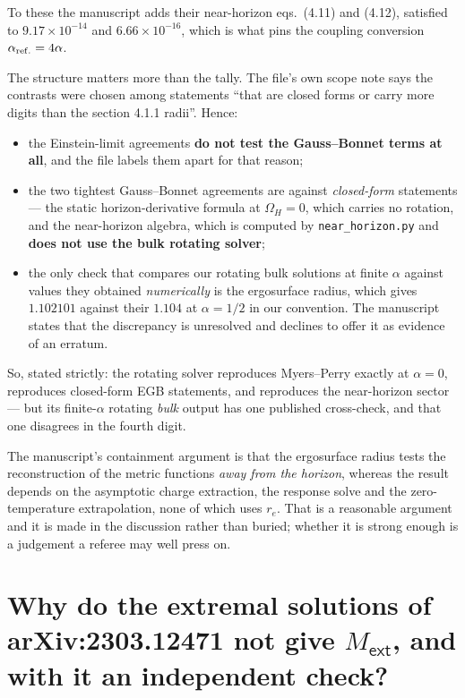 \documentclass[11pt,a4paper]{article}
\newcommand{\ext}{\mathsf{ext}}
\begin{document}
\noindent To these the manuscript adds their near-horizon eqs.~(4.11) and
(4.12), satisfied to $9.17\times10^{-14}$ and $6.66\times10^{-16}$, which is
what pins the coupling conversion $\alpha_{\rm ref.}=4\alpha$.

The structure matters more than the tally. The file's own scope note says the
contrasts were chosen among statements ``that are closed forms or carry more
digits than the section 4.1.1 radii''. Hence:
\begin{itemize}\itemsep3pt
  \item the Einstein-limit agreements \textbf{do not test the Gauss--Bonnet
  terms at all}, and the file labels them apart for that reason;
  \item the two tightest Gauss--Bonnet agreements are against \emph{closed-form}
  statements --- the static horizon-derivative formula at $\Omega_H=0$, which
  carries no rotation, and the near-horizon algebra, which is computed by
  \texttt{near\_horizon.py} and \textbf{does not use the bulk rotating solver};
  \item the only check that compares our rotating bulk solutions at finite
  $\alpha$ against values they obtained \emph{numerically} is the ergosurface
  radius, which gives $1.102101$ against their $1.104$ at $\alpha=1/2$ in our
  convention. The manuscript states that the discrepancy is unresolved and
  declines to offer it as evidence of an erratum.
\end{itemize}

So, stated strictly: the rotating solver reproduces Myers--Perry exactly at
$\alpha=0$, reproduces closed-form EGB statements, and reproduces the
near-horizon sector --- but its finite-$\alpha$ rotating \emph{bulk} output has
one published cross-check, and that one disagrees in the fourth digit.

The manuscript's containment argument is that the ergosurface radius tests the
reconstruction of the metric functions \emph{away from the horizon}, whereas
the result depends on the asymptotic charge extraction, the response solve and
the zero-temperature extrapolation, none of which uses $r_e$. That is a
reasonable argument and it is made in the discussion rather than buried;
whether it is strong enough is a judgement a referee may well press on.

\section{Why do the extremal solutions of arXiv:2303.12471 not give
$M_\ext$, and with it an independent check?}
\label{sec:kkr}
\end{document}
